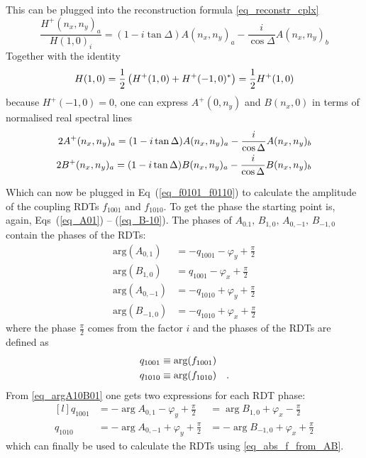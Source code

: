%
This can be plugged into the reconstruction formula \eqref{eq_reconstr_cplx}
%
\begin{equation}
    \frac{H^+(n_x,n_y)_a}{H(1,0)_i} = (1-i\tan\Delta)A(n_x,n_y)_a - \frac{i}{\cos\Delta}A(n_x,n_y)_b
    \label{eq_reconstr_from_norm}
\end{equation}
%
Together with the identity
%
\begin{equation}
    H(1,0) = \frac{1}{2} \left( H^+(1,0) + H^+(-1,0)^*\right) = \frac{1}{2}H^+(1,0)
\end{equation}
%
because $H^+(-1,0) = 0$, one can express $A^+(0,n_y)$ and $B(n_x, 0)$ in terms of normalised real spectral lines
%
\begin{align}
    2A^+(n_x,n_y)_a = (1-i\tan\Delta)A(n_x,n_y)_a - \frac{i}{\cos\Delta}A(n_x,n_y)_b \notag \\
    2B^+(n_x,n_y)_a = (1-i\tan\Delta)B(n_x,n_y)_a - \frac{i}{\cos\Delta}B(n_x,n_y)_b
\end{align}
%

Which can now be plugged in Eq~(\ref{eq_f0101_f0110}) to calculate the amplitude of the coupling RDTs
$f_{1001}$ and $f_{1010}$. To get the phase the starting point is, again, Eqs~(\ref{eq_A01}) -- (\ref{eq_B-10}).
The phases of $A_{0.1},\,B_{1,0},\,A_{0,-1},\,B_{-1,0}$ contain the phases of the RDTs:
%
\begin{align}
  \text{arg}(A_{0,1}) &= -q_{1001} -\varphi_y +\tfrac{\pi}{2} \\
  \text{arg}(B_{1,0}) &= q_{1001} -\varphi_x +\tfrac{\pi}{2} \\
  \text{arg}(A_{0,-1}) &= -q_{1010} +\varphi_y +\tfrac{\pi}{2} \\
  \text{arg}(B_{-1,0}) &= -q_{1010} +\varphi_x +\tfrac{\pi}{2}
  \label{eq_argA10B01}
\end{align}
%
where the phase $\frac{\pi}{2}$ comes from the factor $i$ and the phases of the RDTs are defined as
%
\begin{align}
  q_{1001} &\equiv \text{arg}(f_{1001})\\
  q_{1010} &\equiv \text{arg}(f_{1010})
  \quad .
  \label{eq_arg_f1001}
\end{align}
%
From \eqref{eq_argA10B01} one gets two expressions for each RDT phase:
%
\begin{equation}
  \begin{matrix*}[l]
  q_{1001} &= -\arg{A_{0,1}}-\varphi_y + \tfrac{\pi}{2} &= \arg{B_{1,0}}+\varphi_x -\tfrac{\pi}{2}\\
  q_{1010} &= -\arg{A_{0,-1}} +\varphi_y + \tfrac{\pi}{2} &= -\arg{B_{-1,0}}+\varphi_x +\tfrac{\pi}{2}
  \label{eq_q1001q1010}
  \end{matrix*}
\end{equation}
%
which can finally be used to calculate the RDTs using \eqref{eq_abs_f_from_AB}.

